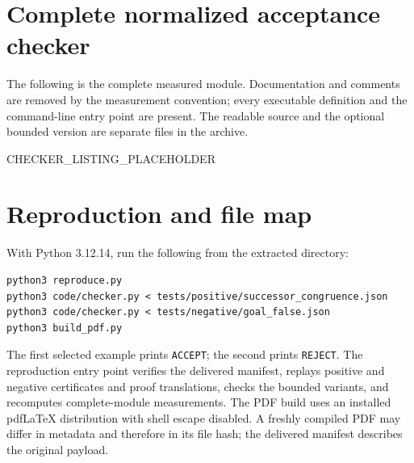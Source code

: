 \clearpage
\section{Complete normalized acceptance checker}
\label{app:checker}

The following is the complete measured module. Documentation and comments
are removed by the measurement convention; every executable definition
and the command-line entry point are present. The readable source and
the optional bounded version are separate files in the archive.

CHECKER_LISTING_PLACEHOLDER

\section{Reproduction and file map}

With Python 3.12.14, run the following from the extracted directory:
\begin{lstlisting}[language={}]
python3 reproduce.py
python3 code/checker.py < tests/positive/successor_congruence.json
python3 code/checker.py < tests/negative/goal_false.json
python3 build_pdf.py
\end{lstlisting}
The first selected example prints \texttt{ACCEPT}; the second prints
\texttt{REJECT}. The reproduction entry point verifies the delivered
manifest, replays positive and negative certificates and proof translations,
checks the bounded variants, and recomputes complete-module measurements.
The PDF build uses an installed pdfLaTeX distribution with shell escape
disabled. A freshly compiled PDF may differ in metadata and therefore in
its file hash; the delivered manifest describes the original payload.

